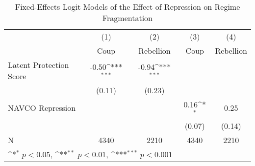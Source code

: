 \begin{table}[htbp]\centering
\def\sym#1{\ifmmode^{#1}\else\(^{#1}\)\fi}
\caption{\label{tab1} Fixed-Effects Logit Models of the Effect of Repression on Regime Fragmentation}
\begin{tabular}{l*{4}{c}}
\hline\hline
                    &\multicolumn{1}{c}{(1)}         &\multicolumn{1}{c}{(2)}         &\multicolumn{1}{c}{(3)}         &\multicolumn{1}{c}{(4)}         \\
                    &        Coup         &   Rebellion         &        Coup         &   Rebellion         \\
\hline
Latent Protection Score&       -0.50\sym{***}&       -0.94\sym{***}&                     &                     \\
                    &      (0.11)         &      (0.23)         &                     &                     \\
NAVCO Repression    &                     &                     &        0.16\sym{*}  &        0.25         \\
                    &                     &                     &      (0.07)         &      (0.14)         \\
\hline
N                   &        4340         &        2210         &        4340         &        2210         \\
\hline\hline
\multicolumn{5}{l}{\footnotesize \sym{*} \(p<0.05\), \sym{**} \(p<0.01\), \sym{***} \(p<0.001\)}\\
\end{tabular}
\end{table}
